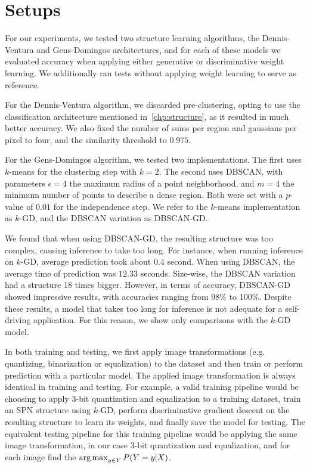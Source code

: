 \section{Setups}

For our experiments, we tested two structure learning algorithms, the Dennis-Ventura and
Gens-Domingos architectures, and for each of these models we evaluated accuracy when applying
either generative or discriminative weight learning. We additionally ran tests without applying
weight learning to serve as reference.

For the Dennis-Ventura algorithm, we discarded pre-clustering, opting to use the classification
architecture mentioned in~\autoref{chp:structure}, as it resulted in much better accuracy. We also
fixed the number of sums per region and gaussians per pixel to four, and the similarity threshold
to $0.975$.

For the Gens-Domingos algorithm, we tested two implementations. The first uses $k$-means for the
clustering step with $k=2$. The second uses DBSCAN, with parameters $\epsilon=4$ the maximum radius
of a point neighborhood, and $m=4$ the minimum number of points to describe a dense region. Both
were set with a $p$-value of $0.01$ for the independence step. We refer to the $k$-means
implementation as $k$-GD, and the DBSCAN variation as DBSCAN-GD.

We found that when using DBSCAN-GD, the resulting structure was too complex, causing inference to
take too long. For instance, when running inference on $k$-GD, average prediction took about $0.4$
second.  When using DBSCAN, the average time of prediction was $12.33$ seconds.  Size-wise, the
DBSCAN variation had a structure 18 times bigger. However, in terms of accuracy, DBSCAN-GD showed
impressive results, with accuracies ranging from 98\% to 100\%. Despite these results, a model that
takes too long for inference is not adequate for a self-driving application. For this reason, we
show only comparisons with the $k$-GD model.

In both training and testing, we first apply image transformations (e.g. quantizing, binarization
or equalization) to the dataset and then train or perform prediction with a particular model. The
applied image transformation is always identical in training and testing. For example, a valid
training pipeline would be choosing to apply 3-bit quantization and equalization to a training
dataset, train an SPN structure using $k$-GD, perform discriminative gradient descent on the
resulting structure to learn its weights, and finally save the model for testing. The equivalent
testing pipeline for this training pipeline would be applying the same image transformation, in our
case 3-bit quantization and equalization, and for each image find the $\operatorname*{arg\,max}_{y\in Y} P(Y=y|X)$.

